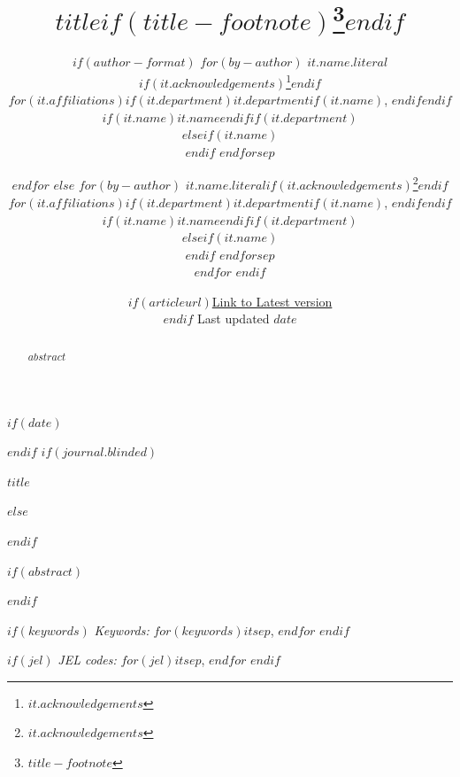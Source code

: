 \def\spacingset#1{\renewcommand{\baselinestretch}%
{#1}\small\normalsize} \spacingset{1}



$if(date)$
\date{$if(articleurl)$\href{$articleurl$}{Link to Latest version}\\ \vspace{1em} $endif$ Last updated $date$}
$endif$
$if(journal.blinded)$
\spacingset{.8}
\bigskip
\bigskip
\bigskip
\begin{center}
  {\LARGE $title$}
\end{center}
\smallskip
\bigskip
\spacingset{1}
$else$
\title{$title$$if(title-footnote)$\thanks{$title-footnote$}$endif$}
\author{
$if(author-format)$
$for(by-author)$
$it.name.literal$$if(it.acknowledgements)$\thanks{$it.acknowledgements$}$endif$\\
$for(it.affiliations)$$if(it.department)$$it.department$$if(it.name)$, $endif$$endif$$if(it.name)$$it.name$$endif$$if(it.department)$\\$elseif(it.name)$\\$endif$
$endfor$$sep$\and $endfor$
$else$
$for(by-author)$
$it.name.literal$$if(it.acknowledgements)$\thanks{$it.acknowledgements$}$endif$\\
$for(it.affiliations)$$if(it.department)$$it.department$$if(it.name)$, $endif$$endif$$if(it.name)$$it.name$$endif$$if(it.department)$\\$elseif(it.name)$\\$endif$
$endfor$$sep$\\$endfor$
$endif$}
\maketitle
$endif$

\bigskip
\bigskip
$if(abstract)$ %
\begin{abstract}
$abstract$
\end{abstract}
$endif$ %

\bigskip
$if(keywords)$
\noindent%
{\it Keywords:} $for(keywords)$$it$$sep$, $endfor$
\vfill
$endif$

$if(jel)$ %
\noindent%
{\it JEL codes:} $for(jel)$$it$$sep$, $endfor$
\vfill
$endif$

\newpage
\spacingset{1.2} %
